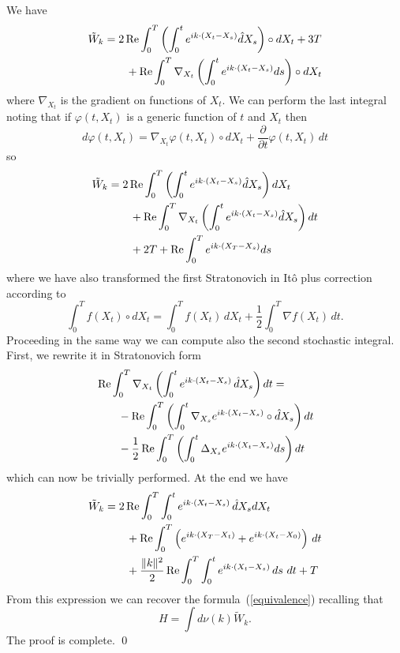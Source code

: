 We have 
\begin{equation*}
\begin{split}
\tilde{W}_k & =  2 \operatorname{Re} \int_0^T \left( \int_0^t e^{ik \cdot (X_t-X_s)} \hat{d}X_s \right)
\circ dX_t + 3T
\\ & \qquad + \operatorname{Re} \int_0^T \nabla_{X_t}  \left( \int_0^t e^{ik \cdot
 (X_t-X_s)} ds \right)  \circ dX_t 
\end{split}
\end{equation*}
where $\nabla_{X_t}$ is the gradient on functions of $X_t$.
We can perform the last integral noting that if $\varphi(t,X_t)$
is a generic function of $t$ and $X_t$ then 
$$
d \varphi(t,X_t) = \nabla_{X_t} \varphi(t,X_t) \circ dX_t +
\frac{\partial}{\partial t}  \varphi(t,X_t)\, dt
$$
so
\begin{equation*}
\begin{split}
\tilde{W}_k & 
 =  
2 \operatorname{Re} \int_0^T \left( \int_0^t e^{ik \cdot (X_t-X_s)} \hat{d}X_s \right) 
dX_t  
\\ & \qquad 
+ \operatorname{Re} \int_0^T \nabla_{X_t} \left( \int_0^t e^{ik \cdot (X_t-X_s)} \hat{d}X_s \right) 
dt   \\ & \qquad + 2T + \operatorname{Re} \int_0^T e^{ik \cdot
 (X_T-X_s)} ds 
\end{split}
\end{equation*}
where we have also transformed the first Stratonovich in It\^o plus correction
according to
$$
\int_0^T f(X_t)\circ dX_t = \int_0^T  f(X_t)\,dX_t + \frac{1}{2} \int_0^T  \nabla f(X_t)\, dt.
$$ 
Proceeding in the same way we can compute also the second stochastic
integral. First, we rewrite it in  Stratonovich form
\begin{equation*}
\begin{split}
& \operatorname{Re} \int_0^T \nabla_{X_t} \left( \int_0^t e^{ik \cdot (X_t-X_s)}\, \hat{d}X_s \right) 
dt = \\ & \qquad 
- \operatorname{Re} \int_0^T \left( \int_0^t \nabla_{X_s} e^{ik \cdot (X_t-X_s)} \circ \hat{d}X_s \right) 
dt 
\\ & \qquad  
- \frac{1}{2} \operatorname{Re} \int_0^T \left( \int_0^t \Delta_{X_s} e^{ik \cdot (X_t-X_s)} ds \right) 
dt
\end{split}
\end{equation*}
which can now be trivially performed. At the end we have 
\begin{equation*}
\begin{split}
\tilde{W}_k &  =  
2 \operatorname{Re} \int_0^T  \int_0^t e^{ik \cdot (X_t-X_s)} \, \hat{d}X_s  dX_t  
\\ & \qquad 
+ \operatorname{Re} \int_0^T \left(e^{ik \cdot (X_T-X_t)} +  e^{ik \cdot
    (X_t-X_0)}\right)\, dt  
\\ & \qquad 
+ \frac{\|k\|^2}{2} \operatorname{Re} \int_0^T \int_0^t e^{ik \cdot (X_t-X_s)}\, ds~dt + T \\
\end{split}
\end{equation*}
From this expression we can recover the formula~(\ref{equivalence}) recalling that
$$
H = \int d\nu(k) \tilde{W}_k.
$$
The proof is complete. 
\qed

